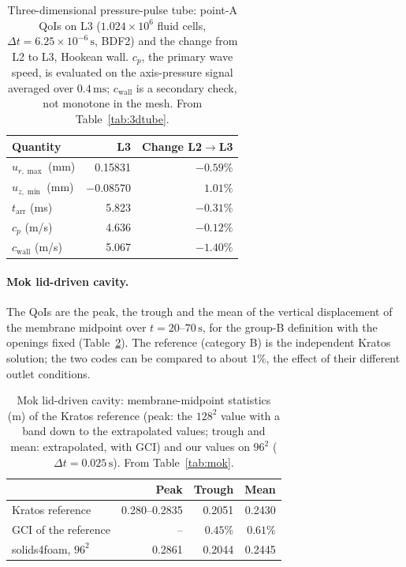 \begin{table}[htbp]
	\centering
	\small
	\caption{Three-dimensional pressure-pulse tube: point-A QoIs on L3 ($1.024\times10^{6}$ fluid cells, $\Delta t = 6.25\times10^{-6}\,\mathrm{s}$, BDF2) and the change from L2 to L3, Hookean wall. $c_p$, the primary wave speed, is evaluated on the axis-pressure signal averaged over $0.4\,\mathrm{ms}$; $c_\mathrm{wall}$ is a secondary check, not monotone in the mesh. From Table~\ref{tab:3dtube}.}
	\label{tab:refvals_3dtube}
	\begin{tabular}{lrr}
		\toprule
		Quantity & L3 & Change L2$\to$L3 \\
		\midrule
		$u_{r,\max}$ (mm) & 0.15831 & $-0.59\%$ \\
		$u_{z,\min}$ (mm) & $-0.08570$ & $1.01\%$ \\
		$t_\mathrm{arr}$ (ms) & 5.823 & $-0.31\%$ \\
		$c_p$ (m/s) & 4.636 & $-0.12\%$ \\
		$c_\mathrm{wall}$ (m/s) & 5.067 & $-1.40\%$ \\
		\bottomrule
	\end{tabular}
\end{table}

\paragraph{Mok lid-driven cavity.}
The QoIs are the peak, the trough and the mean of the vertical displacement of the membrane midpoint over $t = 20$--$70\,\mathrm{s}$, for the group-B definition with the openings fixed (Table~\ref{tab:refvals_mok}).
The reference (category B) is the independent Kratos solution; the two codes can be compared to about $1\%$, the effect of their different outlet conditions.

\begin{table}[htbp]
	\centering
	\small
	\caption{Mok lid-driven cavity: membrane-midpoint statistics (m) of the Kratos reference (peak: the $128^2$ value with a band down to the extrapolated values; trough and mean: extrapolated, with GCI) and our values on $96^2$ ($\Delta t = 0.025\,\mathrm{s}$). From Table~\ref{tab:mok}.}
	\label{tab:refvals_mok}
	\begin{tabular}{lrrr}
		\toprule
		 & Peak & Trough & Mean \\
		\midrule
		Kratos reference & 0.280--0.2835 & 0.2051 & 0.2430 \\
		GCI of the reference & -- & $0.45\%$ & $0.61\%$ \\
		solids4foam, $96^2$ & 0.2861 & 0.2044 & 0.2445 \\
		\bottomrule
	\end{tabular}
\end{table}


